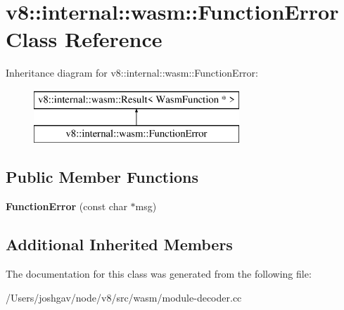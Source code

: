 \hypertarget{classv8_1_1internal_1_1wasm_1_1_function_error}{}\section{v8\+:\+:internal\+:\+:wasm\+:\+:Function\+Error Class Reference}
\label{classv8_1_1internal_1_1wasm_1_1_function_error}
Inheritance diagram for v8\+:\+:internal\+:\+:wasm\+:\+:Function\+Error\+:\begin{figure}[H]
\begin{center}
\leavevmode
\includegraphics[height=2.000000cm]{classv8_1_1internal_1_1wasm_1_1_function_error}
\end{center}
\end{figure}
\subsection*{Public Member Functions}
\begin{DoxyCompactItemize}
\item 
{\bfseries Function\+Error} (const char $\ast$msg)\hypertarget{classv8_1_1internal_1_1wasm_1_1_function_error_a7f8ab4ffd773d51b5ceb2031b35971f5}{}\label{classv8_1_1internal_1_1wasm_1_1_function_error_a7f8ab4ffd773d51b5ceb2031b35971f5}

\end{DoxyCompactItemize}
\subsection*{Additional Inherited Members}


The documentation for this class was generated from the following file\+:\begin{DoxyCompactItemize}
\item 
/\+Users/joshgav/node/v8/src/wasm/module-\/decoder.\+cc\end{DoxyCompactItemize}
